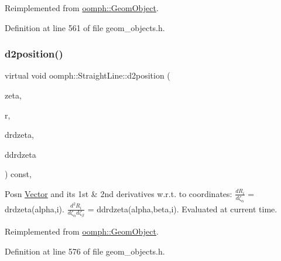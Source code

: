 Reimplemented from \hyperlink{classoomph_1_1GeomObject_a08472dbe196123490ea109762cefd00c}{oomph\+::\+Geom\+Object}.



Definition at line 561 of file geom\+\_\+objects.\+h.

\mbox{\label{classoomph_1_1StraightLine_aa7469f6d75ced06789bb094eef5a9c64}} 
\subsubsection{\texorpdfstring{d2position()}{d2position()}\hspace{0.1cm}{\footnotesize\ttfamily [2/2]}}
{\footnotesize\ttfamily virtual void oomph\+::\+Straight\+Line\+::d2position (\begin{DoxyParamCaption}\item[{const \hyperlink{classoomph_1_1Vector}{Vector}$<$ double $>$ \&}]{zeta,  }\item[{\hyperlink{classoomph_1_1Vector}{Vector}$<$ double $>$ \&}]{r,  }\item[{\hyperlink{classoomph_1_1DenseMatrix}{Dense\+Matrix}$<$ double $>$ \&}]{drdzeta,  }\item[{\hyperlink{classoomph_1_1RankThreeTensor}{Rank\+Three\+Tensor}$<$ double $>$ \&}]{ddrdzeta }\end{DoxyParamCaption}) const\hspace{0.3cm}{\ttfamily [inline]}, {\ttfamily [virtual]}}



Posn \hyperlink{classoomph_1_1Vector}{Vector} and its 1st \& 2nd derivatives w.\+r.\+t. to coordinates\+: $ \frac{dR_i}{d \zeta_\alpha}$ = drdzeta(alpha,i). $ \frac{d^2R_i}{d \zeta_\alpha d \zeta_\beta}$ = ddrdzeta(alpha,beta,i). Evaluated at current time. 



Reimplemented from \hyperlink{classoomph_1_1GeomObject_a4fdbd372e26d4486026c06dcfdaafe81}{oomph\+::\+Geom\+Object}.



Definition at line 576 of file geom\+\_\+objects.\+h.

\mbox{\label{classoomph_1_1StraightLine_a306df01816b5d015d18208c1a9ce1af1}} 
